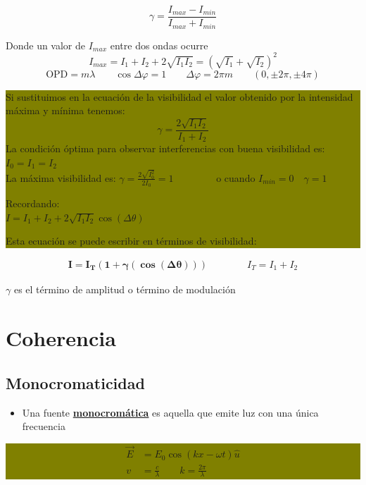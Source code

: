 \documentclass[12pt]{article}
\begin{document}
	\begin{equation*}
		\gamma = \frac{I_{max} - I_{min}}{I_{max} + I_{min}}
	\end{equation*}
	
	Donde un valor de $I_{max}$ entre dos ondas ocurre
	\begin{equation*}
		I_{max} = I_1 + I_2 + 2\sqrt{I_1 I_2} = (\sqrt{I_1} + \sqrt{I_2})^2
	\end{equation*}
	\begin{equation*}
		\text{OPD} = m\lambda \qquad \cos\Delta\varphi = 1 \qquad \Delta\varphi = 2\pi m \qquad (0, \pm2\pi, \pm4\pi)
	\end{equation*}
	
	\colorbox{olive}{\parbox{\textwidth}{\color{white}
			Si sustituimos en la ecuación de la visibilidad el valor obtenido por la intensidad máxima y mínima tenemos:
			\begin{equation*}
				\gamma = \frac{2\sqrt{I_1 I_2}}{I_1 + I_2}
			\end{equation*}
			La condición óptima para observar interferencias con buena visibilidad es:  $I_0 = I_1 = I_2$ \\
			La máxima visibilidad es:  $\gamma = \frac{2\sqrt{I_0^2}}{2I_0} = 1 \qquad \qquad$ o cuando $I_{min} = 0 \quad \gamma = 1$
			
			\vspace{0.2cm}
			\scriptsize{Recordando:} \\
			\normalsize{$I = I_1 + I_2 + 2\sqrt{I_1 I_2}\cos(\Delta\theta)$}
			
			\scriptsize{Esta ecuación se puede escribir en términos de visibilidad:}
	}}
	
	\begin{align*}
		\mathbf{I = I_T (1 + \gamma(\cos(\Delta\theta)))} \qquad \qquad I_T = I_1 + I_2
	\end{align*}
	
	$\gamma$ es el término de amplitud o término de modulación
	
	\section{Coherencia}
	
	\subsection{Monocromaticidad}
	\begin{itemize}
		\item Una fuente \underline{\textbf{monocromática}} es aquella que emite luz con una única frecuencia
	\end{itemize}
	\begin{center}
		\colorbox{olive}{\parbox{0.3\textwidth}{
				\begin{align*}
					\vec{E} &= E_0 \cos(kx - \omega t)\hat{u} \\
					v &= \frac{c}{\lambda} \qquad k = \frac{2\pi}{\lambda}
				\end{align*}
		}}
	\end{center}
	
\end{document}
